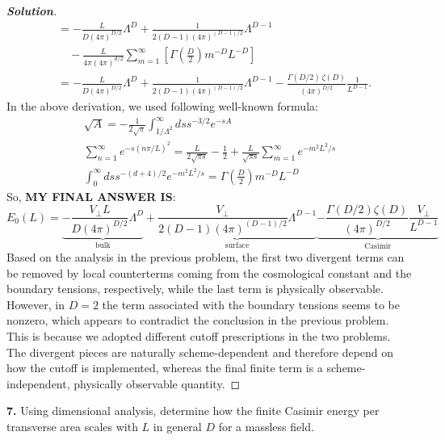\documentclass[11pt]{article}
\newenvironment{solution}[1][]{\begin{proof}[\textbf{Solution}]}{\end{proof}}
\begin{document}
\begin{solution}[17.6]
\begin{align*}
		&=-\frac{L}{D(4\pi)^{D/2}}\Lambda^{D}
		+\frac{1}{2(D-1)(4\pi)^{(D-1)/2}}\Lambda^{D-1} \\[4pt]
		&\quad-\frac{L}{4\pi(4\pi)^{d/2}}\sum_{m=1}^\infty
		\left[\Gamma\!\left(\frac{D}{2}\right)m^{-D}L^{-D}\right] \\[10pt]
		&=-\frac{L}{D(4\pi)^{D/2}}\Lambda^{D}
		+\frac{1}{2(D-1)(4\pi)^{(D-1)/2}}\Lambda^{D-1}
		-\frac{\Gamma(D/2)\,\zeta(D)}{(4\pi)^{D/2}}\frac{1}{L^{D-1}}.
	\end{align*}
	In the above derivation, we used following well-known formula:
	\[
	\begin{gathered}
			\sqrt{A}=-\frac{1}{2\sqrt{\pi}}\int_{1/\Lambda^2}^\infty dss^{-3/2}e^{-sA}\\
			\sum_{n=1}^\infty e^{-s(n\pi/L)^2}=\frac{L}{2\sqrt{\pi s}}-\frac{1}{2}+\frac{L}{\sqrt{\pi s}}\sum_{m=1}^\infty e^{-m^2L^2/s}\\
			\int_0^\infty dss^{-(d+4)/2}e^{-m^2L^2/s}=\Gamma\left(\frac{D}{2}\right)m^{-D}L^{-D}
	\end{gathered}
	\]
	So, \textbf{MY FINAL ANSWER IS}:
	\[
	\boxed{
	E_0(L)=\underbrace{-\frac{V_\perp L}{D(4\pi)^{D/2}}\Lambda^D}_{\text{bulk}}+\underbrace{\frac{V_\perp}{2(D-1)(4\pi)^{(D-1)/2}}\Lambda^{D-1}}_{\text{surface}}\underbrace{-\frac{\Gamma(D/2)\zeta(D)}{(4\pi)^{D/2}}\frac{V_\perp}{L^{D-1}}}_{\text{Casimir}}
	}
	\]
	Based on the analysis in the previous problem, the first two divergent terms can be removed by local counterterms coming from the cosmological constant and the boundary tensions, respectively, while the last term is physically observable. However, in $D=2$ the term associated with the boundary tensions seems to be nonzero, which appears to contradict the conclusion in the previous problem. This is because we adopted different cutoff prescriptions in the two problems. The divergent pieces are naturally scheme-dependent and therefore depend on how the cutoff is implemented, whereas the final finite term is a scheme-independent, physically observable quantity.
\end{solution}
\begin{tcolorbox}[problem]
\textbf{7.} Using dimensional analysis, determine how the finite Casimir energy per transverse area scales with $L$ in general $D$ for a massless field.
\end{tcolorbox}
\end{document}
